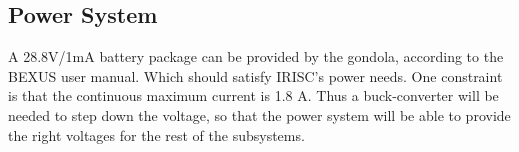 \pagebreak
\subsection{Power System}
A 28.8V/1mA battery package can be provided by the gondola, according to the BEXUS user manual. Which should satisfy IRISC's power needs. One constraint is that the continuous maximum current is 1.8 A. Thus a buck-converter will be needed to step down the voltage, so that the power system will be able to provide the right voltages for the rest of the subsystems.  





\raggedbottom
